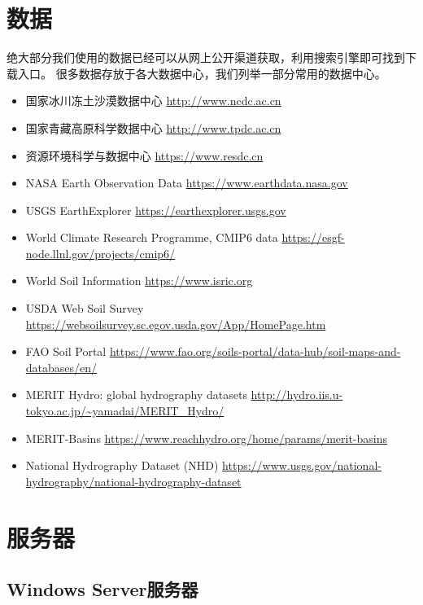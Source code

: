 \documentclass[
]{book}
\providecommand{\tightlist}{%
  \setlength{\itemsep}{0pt}\setlength{\parskip}{0pt}}
\begin{document}
\hypertarget{ux6570ux636e}{%
\section{数据}\label{ux6570ux636e}}

绝大部分我们使用的数据已经可以从网上公开渠道获取，利用搜索引擎即可找到下载入口。 很多数据存放于各大数据中心，我们列举一部分常用的数据中心。

\begin{itemize}
\tightlist
\item
  国家冰川冻土沙漠数据中心 \url{http://www.ncdc.ac.cn}
\item
  国家青藏高原科学数据中心 \url{http://www.tpdc.ac.cn}
\item
  资源环境科学与数据中心 \url{https://www.resdc.cn}
\item
  NASA Earth Observation Data \url{https://www.earthdata.nasa.gov}
\item
  USGS EarthExplorer \url{https://earthexplorer.usgs.gov}
\item
  World Climate Research Programme, CMIP6 data \url{https://esgf-node.llnl.gov/projects/cmip6/}
\item
  World Soil Information \url{https://www.isric.org}
\item
  USDA Web Soil Survey \url{https://websoilsurvey.sc.egov.usda.gov/App/HomePage.htm}
\item
  FAO Soil Portal \url{https://www.fao.org/soils-portal/data-hub/soil-maps-and-databases/en/}
\item
  MERIT Hydro: global hydrography datasets \url{http://hydro.iis.u-tokyo.ac.jp/~yamadai/MERIT_Hydro/}
\item
  MERIT-Basins \url{https://www.reachhydro.org/home/params/merit-basins}
\item
  National Hydrography Dataset (NHD) \url{https://www.usgs.gov/national-hydrography/national-hydrography-dataset}
\end{itemize}

\hypertarget{ux670dux52a1ux5668}{%
\section{服务器}\label{ux670dux52a1ux5668}}

\hypertarget{windows-serverux670dux52a1ux5668}{%
\subsection{Windows Server服务器}\label{windows-serverux670dux52a1ux5668}}
\end{document}
